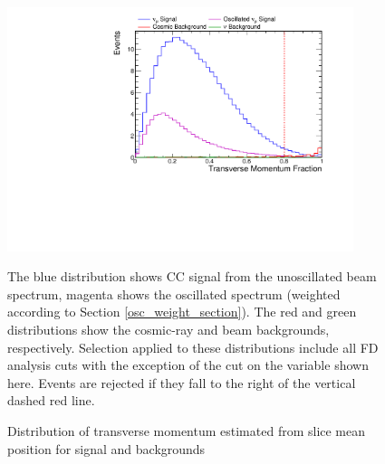 \begin{figure}
\begin{center}
\includegraphics[width=0.9\textwidth]{figures/selection/n1_tranMom.pdf}
\end{center}
\caption{Distribution of transverse momentum estimated from slice mean position
for signal and backgrounds}{
The blue distribution shows \numu CC signal from the unoscillated beam spectrum,
magenta shows the oscillated spectrum (weighted according to Section
\ref{osc_weight_section}).
The red and green distributions show the cosmic-ray and beam backgrounds,
respectively.
Selection applied to these distributions include all FD analysis cuts
with the exception of the cut on the variable shown here.
Events are rejected if they fall to the right of the vertical
dashed red line.
}
\label{pngptp}
\end{figure}

